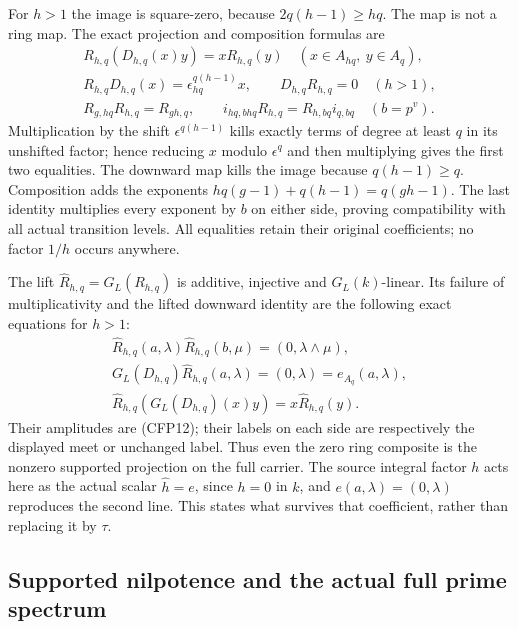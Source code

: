 For $h>1$ the image is square-zero, because
$2q(h-1)\ge hq$. The map is not a ring map.
The exact projection and composition formulas are
\begin{equation}\tag{CFP12}
\begin{gathered}
 R_{h,q}(D_{h,q}(x)y)=xR_{h,q}(y)
                   \quad(x\in A_{hq},\ y\in A_q),\\
 R_{h,q}D_{h,q}(x)=\epsilon_{hq}^{q(h-1)}x,\qquad
 D_{h,q}R_{h,q}=0\quad(h>1),\\
 R_{g,hq}R_{h,q}=R_{gh,q},\qquad
 i_{hq,bhq}R_{h,q}=R_{h,bq}i_{q,bq}
                                     \quad(b=p^v).
\end{gathered}
\end{equation}
Multiplication by the shift $\epsilon^{q(h-1)}$
kills exactly terms of degree at least $q$ in its
unshifted factor; hence reducing $x$ modulo
$\epsilon^q$ and then multiplying gives the first
two equalities. The downward map kills the image
because $q(h-1)\ge q$. Composition adds the
exponents $hq(g-1)+q(h-1)=q(gh-1)$. The last
identity multiplies every exponent by $b$ on
either side, proving compatibility with all
actual transition levels. All equalities retain
their original coefficients; no factor $1/h$
occurs anywhere.

The lift $\widehat R_{h,q}=G_L(R_{h,q})$ is additive,
injective and $G_L(k)$-linear. Its failure of
multiplicativity and the lifted downward identity
are the following exact equations for $h>1$:
\begin{equation}\tag{CFP13}
\begin{gathered}
 \widehat R_{h,q}(a,\lambda)
           \widehat R_{h,q}(b,\mu)=(0,\lambda\wedge\mu),\\
 G_L(D_{h,q})\widehat R_{h,q}(a,\lambda)=(0,\lambda)
                                      =e_{A_q}(a,\lambda),\\
 \widehat R_{h,q}(G_L(D_{h,q})(x)y)
                   =x\widehat R_{h,q}(y).
\end{gathered}
\end{equation}
Their amplitudes are (CFP12); their labels on
each side are respectively the displayed meet
or unchanged label. Thus even the zero ring
composite is the nonzero supported projection
on the full carrier. The source integral
factor $h$ acts here as the actual scalar
$\widehat h=e$, since $h=0$ in $k$, and
$e(a,\lambda)=(0,\lambda)$ reproduces the
second line. This states what survives that
coefficient, rather than replacing it by $\tau$.

\subsection{Supported nilpotence and the actual full prime spectrum}

